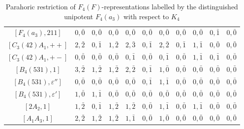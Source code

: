 \begin{landscape}
\begin{table}[!ht]
{\begin{tabular}{|c|cccccccccc|}
        $[F_4(a_3),211]$ & $0,\bar0$ & $0,\bar0$ & $0,\bar0$ & $0,\bar0$ & $0,\bar0$ & $0,\bar0$ & $0,\bar0$ & $0,\bar0$ & $0,\bar1$ & $0,\bar0$ \\
        $[C_3(42)A_1,++]$ & $2,\bar2$ & $0,\bar1$ & $1,\bar2$ & $2,\bar{3}$ & $0,\bar1$ & $2,\bar2$ & $0,\bar1$ & $1,\bar1$ & $0,\bar0$ & $0,\bar0$ \\
        $[C_3(42)A_1,+-]$ & $0,\bar0$ & $0,\bar0$ & $0,\bar0$ & $0,\bar1$ & $0,\bar0$ & $0,\bar1$ & $0,\bar0$ & $1,\bar1$ & $0,\bar1$ & $0,\bar0$ \\
        $[B_4(531),1]$ & $3,\bar2$ & $1,\bar2$ & $1,\bar2$ & $2,\bar2$ & $0,\bar1$ & $1,\bar0$ & $0,\bar0$ & $0,\bar0$ & $0,\bar0$ & $0,\bar0$ \\
        $[B_4(531),\varepsilon'']$ & $0,\bar0$ & $0,\bar0$ & $0,\bar0$ & $0,\bar0$ & $0,\bar1$ & $1,\bar1$ & $0,\bar0$ & $0,\bar0$ & $0,\bar0$ & $0,\bar0$ \\
        $[B_4(531),\varepsilon']$ & $1,\bar0$ & $1,\bar1$ & $0,\bar0$ & $0,\bar0$ & $0,\bar0$ & $0,\bar0$ & $0,\bar0$ & $0,\bar0$ & $0,\bar0$ & $0,\bar0$ \\
        $[2A_2,1]$ & $1,\bar2$ & $0,\bar1$ & $1,\bar2$ & $1,\bar2$ & $0,\bar0$ & $1,\bar1$ & $0,\bar0$ & $1,\bar1$ & $0,\bar0$ & $0,\bar0$ \\
        $[A_1A_3,1]$ & $2,\bar2$ & $1,\bar2$ & $1,\bar2$ & $1,\bar1$ & $0,\bar0$ & $1,\bar0$ & $0,\bar0$ & $0,\bar0$ & $0,\bar0$ & $0,\bar0$ \\\hline
        \end{tabular}
        }
        \caption{Parahoric restriction of $F_4(F)$-representations labelled by the distinguished unipotent $F_4(a_3)$ with respect to $K_4$}
    \end{table}


\end{landscape}
